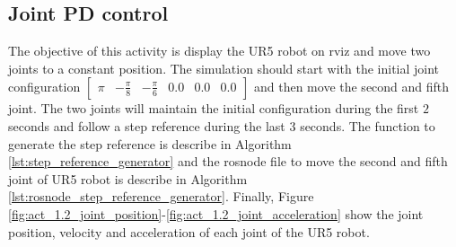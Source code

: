 \subsection{Joint PD control}
The objective of this activity is display the UR5 robot on rviz and move two joints to a constant position. The simulation should start with the initial joint configuration $\begin{bmatrix} \pi & -\frac{\pi}{8} & -\frac{\pi}{6} & 0.0 & 0.0 & 0.0 \end{bmatrix}$ and then move the second and fifth joint. The two joints will maintain the initial configuration during the first $2$ seconds and follow a step reference during the last $3$ seconds. The function to generate the step reference is describe in Algorithm \ref{lst:step_reference_generator} and the rosnode file to move the second and fifth joint of UR5 robot is describe in Algorithm \ref{lst:rosnode_step_reference_generator}. Finally, Figure \ref{fig:act_1.2_joint_position}-\ref{fig:act_1.2_joint_acceleration} show the joint position, velocity and acceleration of each joint of the UR5 robot.

